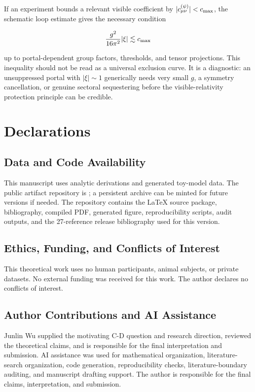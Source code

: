 \documentclass[11pt]{article}
\begin{document}
If an experiment bounds a relevant visible coefficient by \(|c_{\mu\nu}^{(\psi)}|<c_{\rm max}\), the schematic loop estimate gives the necessary condition


\[
\frac{g^2}{16\pi^2}|\xi| \lesssim c_{\rm max}
\]


up to portal-dependent group factors, thresholds, and tensor projections. This inequality should not be read as a universal exclusion curve. It is a diagnostic: an unsuppressed portal with \(|\xi|\sim1\) generically needs very small \(g\), a symmetry cancellation, or genuine sectoral sequestering before the visible-relativity protection principle can be credible.


\section*{Declarations}


\subsection*{Data and Code Availability}


This manuscript uses analytic derivations and generated toy-model data. The public artifact repository is ; a persistent archive can be minted for future versions if needed. The repository contains the LaTeX source package, bibliography, compiled PDF, generated figure, reproducibility scripts, audit outputs, and the 27-reference release bibliography used for this version.


\subsection*{Ethics, Funding, and Conflicts of Interest}


This theoretical work uses no human participants, animal subjects, or private datasets. No external funding was received for this work. The author declares no conflicts of interest.


\subsection*{Author Contributions and AI Assistance}


Junlin Wu supplied the motivating C-D question and research direction, reviewed the theoretical claims, and is responsible for the final interpretation and submission. AI assistance was used for mathematical organization, literature-search organization, code generation, reproducibility checks, literature-boundary auditing, and manuscript drafting support. The author is responsible for the final claims, interpretation, and submission.


{\scriptsize
\setlength{\bibsep}{0pt plus 0.3ex}
\setlength{\bibhang}{0.4em}


}
\end{document}
